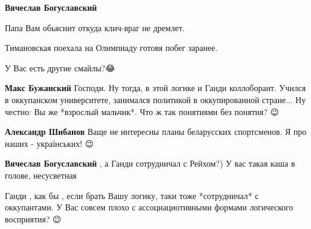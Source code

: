 \begin{itemize}
\begin{itemize}
\textbf{Вячеслав Богуславский} 

Папа Вам обьяснит откуда клич-враг не дремлет.

Тимановская поехала на Олимпиаду готовя побег заранее.

У Вас есть другие смайлы?😂

 
\textbf{Макс Бужанский} Господи. Ну тогда, в этой логике и Ганди коллоборант. Учился в оккупанском университете, занимался политикой в оккупированной стране... Ну честно: Вы же *взрослый мальчик*. Что ж так понятиями без понятия? 😉

 
\textbf{Александр Шибанов} Ваще не интересны планы беларусских спортсменов. Я про наших - українських! 😉

 
\textbf{Вячеслав Богуславский} , а Ганди сотрудничал с Рейхом?) У вас такая каша в голове, несусветная

 
Ганди , как бы , если брать Вашу логику, таки тоже *сотрудничал* с оккупантами. У Вас совсем плохо с ассоциациотивными формами логического восприятия? 😉

 

\end{itemize}
\end{itemize}
